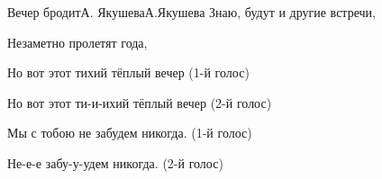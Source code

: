 \documentclass[11pt,a5paper]{book}
\begin{document}
\begin{song}{Вечер бродит}{}{А. Якушева}{А.Якушева}{}{}
Знаю, будут и другие встречи,\par
Незаметно пролетят года,\par
Но вот этот тихий тёплый вечер 		(1-й голос)\par
Но вот этот ти-и-ихий тёплый вечер    	(2-й голос)\par
Мы с тобою не забудем никогда. 		(1-й голос)\par
Не-е-е забу-у-удем никогда. 		(2-й голос)\\

\begin{SBSection*}
\begin{figure}[b!]
\end{figure}
\end{SBSection*}
\end{song}
\end{document}
